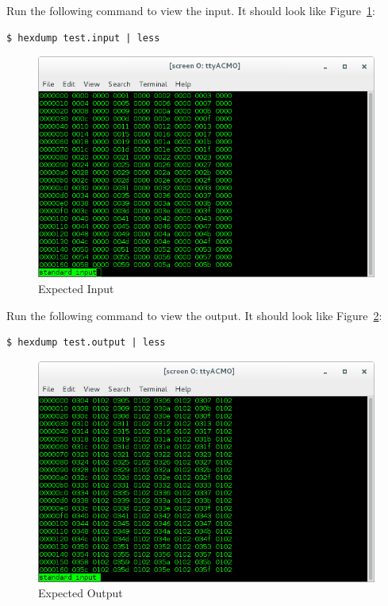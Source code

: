 \pagebreak
Run the following command to view the input. It should look like Figure~\ref{fig:inBias2}: \\
\begin{verbatim}
$ hexdump test.input | less
\end{verbatim}
\begin{figure}[H]
	\centerline{\includegraphics[scale=0.5]{zed_bias_input}}
	\caption{Expected Input}
	\label{fig:inBias2}
\end{figure}

Run the following command to view the output. It should look like Figure~\ref{fig:outBias2}: \\
\begin{verbatim}
$ hexdump test.output | less
\end{verbatim}
\begin{figure}[H]
	\centerline{\includegraphics[scale=0.5]{zed_bias_output}}
	\caption{Expected Output}
	\label{fig:outBias2}
\end{figure}

